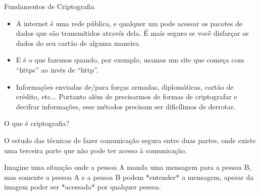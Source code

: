





\begin{frame}{Fundamentos de Criptografia}{}
\begin{itemize}
\pitem Quando fazemos compras pela internet, temos que enviar o número do cartão de crédito para efetivar a compra.
\item A internet é uma rede pública, e qualquer um pode acessar os pacotes de dados que são transmitidos através dela.
\pitem É mais seguro se você disfarçar os dados do seu cartão de alguma maneira.
\item E é o que fazemos quando, por exemplo, usamos um site que começa com ``https'' ao invés de ``http''.
\end{itemize}
\end{frame}


\begin{frame}{}{}
\begin{itemize}
\pitem Muitas informações podem ser roubadas em conexões pela internet.
\item Informações enviadas de/para forças armadas, diplomáticas,  cartão de crédito, etc...
\pitem Portanto além de precisarmos de formas de criptografar e decifrar informações, esse métodos precisam ser dificílimos de derrotar.
\end{itemize}
\end{frame}





\begin{frame}{O que é criptografia?}{}
\begin{itemize}
\pitem O estudo das técnicas de fazer comunicação segura entre duas partes,
onde existe uma terceira parte que não pode ter acesso à comunicação.

\pitem Imagine uma situação onde a pessoa A manda uma mensagem para a pessoa B,
mas somente a pessoa A e a pessoa B podem *entender* a mensagem,
apesar da imagem poder ser *acessada* por qualquer pessoa.

\end{itemize}
\end{frame}






